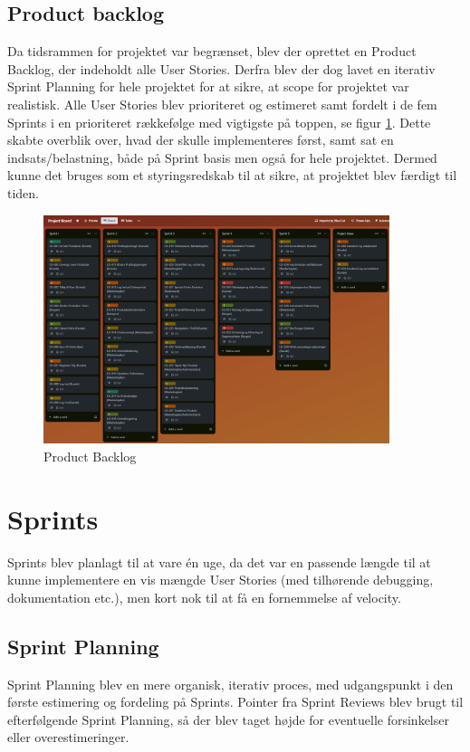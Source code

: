 \subsection{Product backlog}
Da tidsrammen for projektet var begrænset, blev der oprettet en Product Backlog, der indeholdt alle User Stories. Derfra blev der dog lavet en iterativ Sprint Planning for hele projektet for at sikre, at scope for projektet var realistisk.
Alle User Stories blev prioriteret og estimeret samt fordelt i de fem Sprints i en prioriteret rækkefølge med vigtigste på toppen, se figur \ref{fig:trello-sprint-backlogs}. 
Dette skabte overblik over, hvad der skulle implementeres først, samt sat en indsats/belastning, både på Sprint basis men også for hele projektet.
Dermed kunne det bruges som et styringsredskab til at sikre, at projektet blev færdigt til tiden.
\begin{figure}[H]
    \centering
    \includegraphics[width=0.9\textwidth]{figures/scrum/trello-sprint-backlogs.png}
    \caption{Product Backlog}
    \label{fig:trello-sprint-backlogs}
\end{figure}

\section{Sprints}
Sprints blev planlagt til at vare én uge, da det var en passende længde til at kunne implementere en vis mængde User Stories (med tilhørende debugging, dokumentation etc.), men kort nok til at få en fornemmelse af velocity.

\subsection{Sprint Planning}
Sprint Planning blev en mere organisk, iterativ proces, med udgangspunkt i den første estimering og fordeling på Sprints. 
Pointer fra Sprint Reviews blev brugt til efterfølgende Sprint Planning, så der blev taget højde for eventuelle forsinkelser eller overestimeringer.

